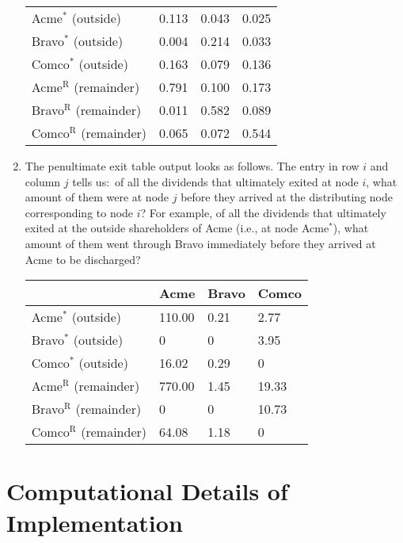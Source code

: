 \documentclass[a4paper,12pt,reqno]{amsart}
\theoremstyle{definition} \newtheorem{example}{Example}
\theoremstyle{definition} \newtheorem{condition}{Condition}
\theoremstyle{definition} \newtheorem{corollary}{Corollary}
\theoremstyle{definition} \newtheorem{claim}{Claim}
\theoremstyle{definition} \newtheorem{definition}{Definition}
\theoremstyle{definition} \newtheorem{conjecture}{Conjecture}
\theoremstyle{definition} \newtheorem{lemma}{Lemma}
\theoremstyle{definition} \newtheorem{theorem}{Theorem}
\theoremstyle{definition} \newtheorem*{theoremNoNumber}{Theorem}
\theoremstyle{definition} \newtheorem*{lemmaCorrespondence}{Lemma \ref{lem:correspondence}}
\theoremstyle{definition}\newtheorem{proposition}{Proposition}
\theoremstyle{definition} \newtheorem{result}{Result}
\theoremstyle{definition} \newtheorem*{definitionNoNumber}{Definition}
\theoremstyle{definition} \newtheorem{assumption}{Assumption}
\theoremstyle{definition} \newtheorem*{assumptionNoNumber}{Assumption}
\theoremstyle{definition} \newtheorem*{fact}{Fact}
\theoremstyle{definition} \newtheorem*{property}{Property}
\theoremstyle{definition} \newtheorem{remark}{Remark}
\begin{document}
\begin{enumerate}
\begin{center}
\begin{tabular}{llll}
\midrule
Acme$^*$ (outside) & 0.113 & 0.043 & 0.025  \\
Bravo$^*$ (outside)  & 0.004 & 0.214 & 0.033  \\
Comco$^*$ (outside)  & 0.163 & 0.079 & 0.136  \\
\midrule
\midrule
Acme$^\text{R}$ (remainder) & 0.791 & 0.100 & 0.173  \\
Bravo$^\text{R}$ (remainder)  & 0.011 & 0.582 & 0.089  \\
Comco$^\text{R}$ (remainder)  & 0.065 & 0.072 & 0.544 \\
\bottomrule
\end{tabular}
\end{center}

\bigskip
\item The penultimate exit table output looks as follows.
The entry in row $i$ and column $j$ tells us:\ of all the dividends that ultimately exited at node $i$, what amount of them were at node $j$ before they arrived at the distributing node corresponding to node $i$? For example, of all the dividends that ultimately exited at the outside shareholders of Acme (i.e., at node Acme$^*$), what amount of them went through Bravo immediately before they arrived at Acme to be discharged? \bigskip
\begin{center}
\begin{tabular}{llll}
\toprule
 & Acme & Bravo & Comco  \\

\midrule
Acme$^*$ (outside) & 110.00 & 0.21 & 2.77  \\
Bravo$^*$ (outside)  & 0 & 0 & 3.95  \\
Comco$^*$ (outside)  & 16.02 & 0.29 & 0  \\
\midrule
\midrule
Acme$^\text{R}$ (remainder) & 770.00 & 1.45 & 19.33  \\
Bravo$^\text{R}$ (remainder)  & 0 & 0 & 10.73  \\
Comco$^\text{R}$ (remainder)  & 64.08 & 1.18 & 0 \\
\bottomrule
\end{tabular}
\end{center}

\end{enumerate}
\newpage

\section{Computational Details of Implementation} \label{sec:implementation}
\end{document}

